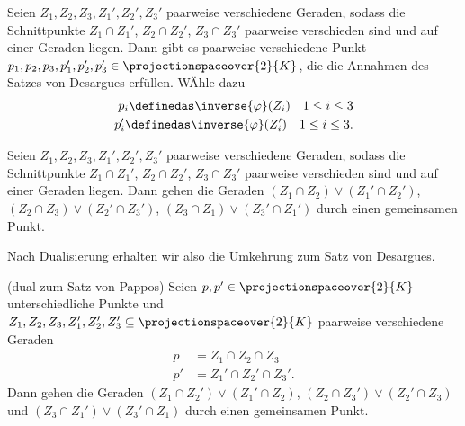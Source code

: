 Seien \( Z_1,Z_2,Z_3,Z_1',Z_2',Z_3' \) paarweise verschiedene Geraden, sodass die Schnittpunkte \( Z_1\cap Z_1' \), \( Z_2\cap Z_2' \), \( Z_3\cap Z_3' \) paarweise verschieden sind und auf einer Geraden liegen. Dann gibt es paarweise verschiedene Punkt \( p_1,p_2,p_3,p_1',p_2',p_3'\in \projectionspaceover{2}{K} \), die die Annahmen des Satzes von Desargues erfüllen. WÄhle dazu
\begin{align*}
  p_i\definedas \inverse{\varphi}(Z_i)\quad 1\leq i\leq 3\\
  p_i'\definedas \inverse{\varphi}(Z_i')\quad 1\leq i\leq 3.
\end{align*}
\begin{satz}
  Seien \( Z_1,Z_2,Z_3,Z_1',Z_2',Z_3' \) paarweise verschiedene Geraden, sodass die Schnittpunkte \( Z_1\cap Z_1' \), \( Z_2\cap Z_2' \), \( Z_3\cap Z_3' \) paarweise verschieden sind und auf einer Geraden liegen. Dann gehen die Geraden \( (Z_1\cap Z_2)\vee (Z_1'\cap Z_2') \), \( (Z_2\cap Z_3)\vee (Z_2'\cap Z_3') \), \( (Z_3\cap Z_1)\vee (Z_3'\cap Z_1') \) durch einen gemeinsamen Punkt.
\end{satz}
\begin{bemerkung*}
  Nach Dualisierung erhalten wir also die Umkehrung zum Satz von Desargues.
\end{bemerkung*}
\begin{satz}[Brianchon]
  (dual zum Satz von Pappos) Seien \( p,p'\in \projectionspaceover{2}{K} \) unterschiedliche Punkte und \( Z_1,Z_2,Z_3,Z_1',Z_2',Z_3'\subseteq \projectionspaceover{2}{K} \) paarweise verschiedene Geraden 
  \begin{align*}
    p&=Z_1\cap Z_2\cap Z_3\\
    p'&=Z_1'\cap Z_2'\cap Z_3'.
  \end{align*}
  Dann gehen die Geraden \( (Z_1\cap Z_2')\vee (Z_1'\cap Z_2) \), \( (Z_2\cap Z_3')\vee (Z_2'\cap Z_3) \) und \( (Z_3\cap Z_1')\vee (Z_3'\cap Z_1)\) durch einen gemeinsamen Punkt.
  
\end{satz}
